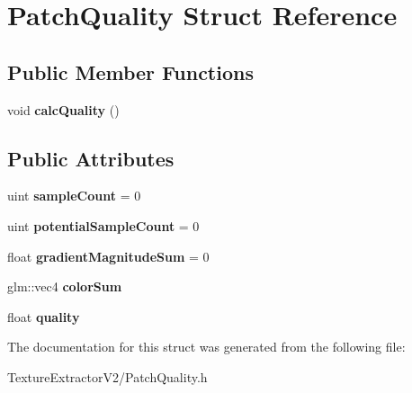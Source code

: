 \hypertarget{struct_patch_quality}{}\section{Patch\+Quality Struct Reference}
\label{struct_patch_quality}
\subsection*{Public Member Functions}
\begin{DoxyCompactItemize}
\item 
\hypertarget{struct_patch_quality_a330d17106af0e6f3d484c7777201c6f8}{}void {\bfseries calc\+Quality} ()\label{struct_patch_quality_a330d17106af0e6f3d484c7777201c6f8}

\end{DoxyCompactItemize}
\subsection*{Public Attributes}
\begin{DoxyCompactItemize}
\item 
\hypertarget{struct_patch_quality_a3c8d512ff345ceef200c3f7c71e7ac38}{}uint {\bfseries sample\+Count} = 0\label{struct_patch_quality_a3c8d512ff345ceef200c3f7c71e7ac38}

\item 
\hypertarget{struct_patch_quality_adf9ac6ee8def50e84e0e68c4a9078fc2}{}uint {\bfseries potential\+Sample\+Count} = 0\label{struct_patch_quality_adf9ac6ee8def50e84e0e68c4a9078fc2}

\item 
\hypertarget{struct_patch_quality_abc1d602a83896430d93d887c14239cbc}{}float {\bfseries gradient\+Magnitude\+Sum} = 0\label{struct_patch_quality_abc1d602a83896430d93d887c14239cbc}

\item 
\hypertarget{struct_patch_quality_a96523c3184058de7a735c46baff38a35}{}glm\+::vec4 {\bfseries color\+Sum}\label{struct_patch_quality_a96523c3184058de7a735c46baff38a35}

\item 
\hypertarget{struct_patch_quality_abfe27ea5bb26348daaad5445958aff92}{}float {\bfseries quality}\label{struct_patch_quality_abfe27ea5bb26348daaad5445958aff92}

\end{DoxyCompactItemize}


The documentation for this struct was generated from the following file\+:\begin{DoxyCompactItemize}
\item 
Texture\+Extractor\+V2/Patch\+Quality.\+h\end{DoxyCompactItemize}

